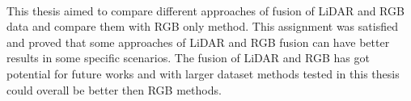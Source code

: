 \documentclass[twoside]{ctuthesis}
\theoremstyle{plain}
\theoremstyle{definition}
\theoremstyle{note}
\begin{document}
\\
This thesis aimed to compare different approaches of fusion of LiDAR and RGB data and compare them with RGB only method. This assignment was satisfied and proved that some approaches of LiDAR and RGB fusion can have better results in some specific scenarios. The fusion of LiDAR and RGB has got potential for future works and with larger dataset methods tested in this thesis could overall be better then RGB methods.


\end{document}
